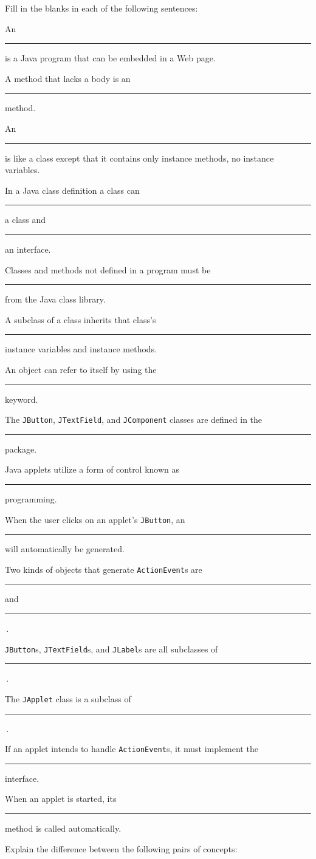 \begin{EXRtwo}

\item  Fill in the blanks in each of the following sentences:

\begin{EXRtwoLL}
\baselineskip=13pt\item  An  \rule{40pt}{0.5pt} is a Java program that can be embedded in a Web page.
\item  A method that lacks a body is an \rule{40pt}{0.5pt} method.
\item  An \rule{40pt}{0.5pt} is like a class except that it contains
only instance methods, no instance variables.
\item  In a Java class definition a class can \rule{40pt}{0.5pt}
a class and \rule{40pt}{0.5pt}  an interface.
\item  Classes and methods not defined in a program must be \rule{40pt}{0.5pt}
 from the Java class library.
\item  A subclass of a class inherits that class's \rule{40pt}{0.5pt} instance variables and instance methods.
\item  An object can refer to itself by using the \rule{40pt}{0.5pt} keyword.
\item  The {\tt JButton}, {\tt JTextField}, and {\tt JComponent} classes
are defined in the  \rule{40pt}{0.5pt} package.
\item  Java applets utilize a form of control known as \rule{40pt}{0.5pt}  programming.
\item  When the user clicks on an applet's {\tt JButton}, an
  \rule{40pt}{0.5pt} will automatically be generated.
\item  Two kinds of objects that generate {\tt ActionEvent}s are \rule{40pt}{0.5pt} and
\rule{40pt}{0.5pt}\,.
\item  {\tt JButton}s, {\tt JTextField}s, and
{\tt JLabel}s are all subclasses of \rule{40pt}{0.5pt}\,.
\item  The {\tt JApplet} class is a subclass of  \rule{40pt}{0.5pt}\,.
\item  If an applet intends to handle {\tt ActionEvent}s, it must
implement the \rule{40pt}{0.5pt} interface.
\item  When an applet is started, its  \rule{40pt}{0.5pt} method is called
automatically.
\end{EXRtwoLL}

\baselineskip=11pt\item  Explain the difference between the following pairs of
concepts:


\end{EXRtwo}
